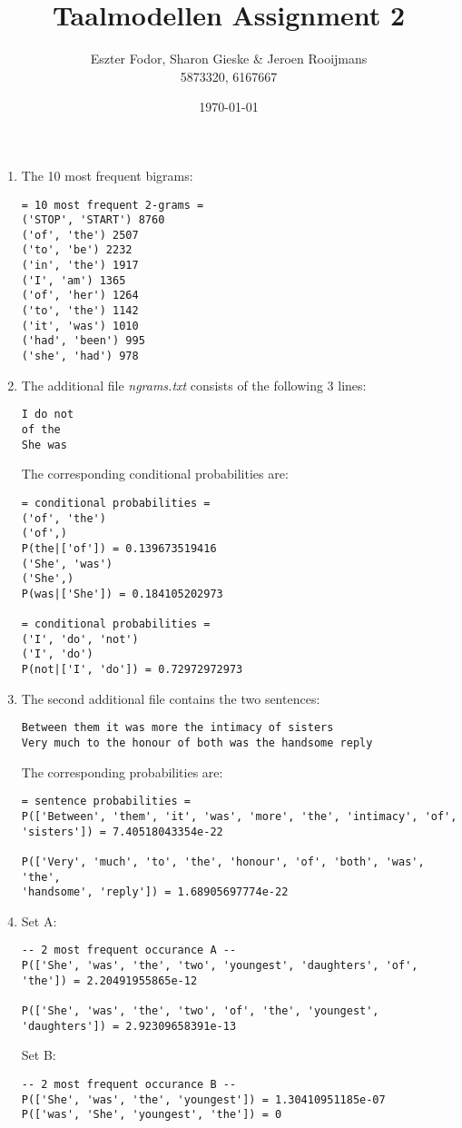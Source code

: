 \documentclass[11pt, a4paper]{article}
\title{Taalmodellen Assignment 2}
\author{Eszter Fodor, Sharon Gieske \& Jeroen Rooijmans \\ 5873320, 6167667}
\date{\today}
\begin{document}
\maketitle

\begin{enumerate}
	\item The 10 most frequent bigrams:
\begin{verbatim}
= 10 most frequent 2-grams =
('STOP', 'START') 8760
('of', 'the') 2507
('to', 'be') 2232
('in', 'the') 1917
('I', 'am') 1365
('of', 'her') 1264
('to', 'the') 1142
('it', 'was') 1010
('had', 'been') 995
('she', 'had') 978
\end{verbatim}

\item The additional file \textit{ngrams.txt} consists of the following 3 lines:
\begin{verbatim}
I do not
of the
She was
\end{verbatim}
The corresponding conditional probabilities are:
\begin{verbatim}
= conditional probabilities =
('of', 'the')
('of',)
P(the|['of']) = 0.139673519416 
('She', 'was')
('She',)
P(was|['She']) = 0.184105202973 

= conditional probabilities =
('I', 'do', 'not')
('I', 'do')
P(not|['I', 'do']) = 0.72972972973
\end{verbatim}

\newpage{}

\item The second additional file contains the two sentences:
\begin{verbatim}
Between them it was more the intimacy of sisters
Very much to the honour of both was the handsome reply
\end{verbatim}
The corresponding probabilities are:
\begin{verbatim}
= sentence probabilities =
P(['Between', 'them', 'it', 'was', 'more', 'the', 'intimacy', 'of', 
'sisters']) = 7.40518043354e-22 

P(['Very', 'much', 'to', 'the', 'honour', 'of', 'both', 'was', 'the', 
'handsome', 'reply']) = 1.68905697774e-22
\end{verbatim}

\item Set A:
\begin{verbatim}
-- 2 most frequent occurance A --
P(['She', 'was', 'the', 'two', 'youngest', 'daughters', 'of',
'the']) = 2.20491955865e-12 

P(['She', 'was', 'the', 'two', 'of', 'the', 'youngest', 
'daughters']) = 2.92309658391e-13
\end{verbatim}

Set B:
\begin{verbatim}
-- 2 most frequent occurance B --
P(['She', 'was', 'the', 'youngest']) = 1.30410951185e-07 
P(['was', 'She', 'youngest', 'the']) = 0 
\end{verbatim}

\end{enumerate}
\end{document}
